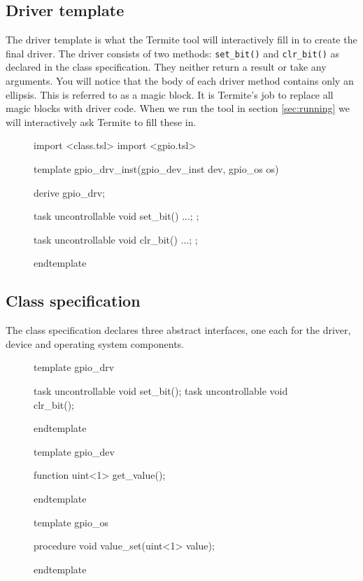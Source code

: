\documentclass{article}
\newcommand{\code}[1]{\texttt{#1}}
\begin{document}
\subsection{Driver template}

The driver template is what the Termite tool will interactively fill in to create the final driver. The driver consists of two methods: \code{set\_bit()} and \code{clr\_bit()} as declared in the class specification. They neither return a result or take any arguments. You will notice that the body of each driver method contains only an ellipsis. This is referred to as a magic block. It is Termite's job to replace all magic blocks with driver code. When we run the tool in section \ref{sec:running} we will interactively ask Termite to fill these in.

\begin{figure}[H]
\lstset{numbers=left}
\begin{tsllisting}
import <class.tsl>
import <gpio.tsl>

template gpio_drv_inst(gpio_dev_inst dev, gpio_os os)

derive gpio_drv;

task uncontrollable void set_bit(){
    ...;
};

task uncontrollable void clr_bit(){
    ...;
};

endtemplate
\end{tsllisting}
\end{figure}

\subsection{Class specification}

The class specification declares three abstract interfaces, one each for the driver, device and operating system components. 

\begin{figure}[H]
\lstset{numbers=left}
\begin{tsllisting}
template gpio_drv

task uncontrollable void set_bit();
task uncontrollable void clr_bit();

endtemplate

template gpio_dev

function uint<1> get_value();

endtemplate

template gpio_os

procedure void value_set(uint<1> value);

endtemplate
\end{tsllisting}
\end{figure}
\end{document}
